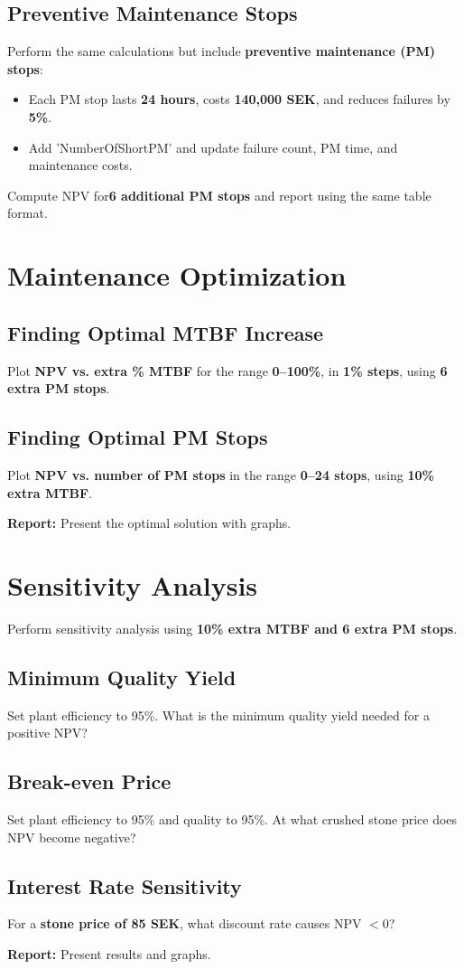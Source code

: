 \documentclass[a4paper,12pt]{exam}
\begin{document}
\subsection{Preventive Maintenance Stops}
Perform the same calculations but include \textbf{preventive maintenance (PM) stops}:
\begin{itemize}
    \item Each PM stop lasts \textbf{24 hours}, costs \textbf{140,000 SEK}, and reduces failures by \textbf{5\%}.
    \item Add 'NumberOfShortPM' and update failure count, PM time, and maintenance costs.
\end{itemize}
Compute NPV for\textbf{6 additional PM stops} and report using the same table format.

\section{Maintenance Optimization}
\subsection{Finding Optimal MTBF Increase}
Plot \textbf{NPV vs. extra \% MTBF} for the range \textbf{0–100\%}, in \textbf{1\% steps}, using \textbf{6 extra PM stops}.

\subsection{Finding Optimal PM Stops}
Plot \textbf{NPV vs. number of PM stops} in the range \textbf{0–24 stops}, using \textbf{10\% extra MTBF}.

\textbf{Report:} Present the optimal solution with graphs.

\section{Sensitivity Analysis}
Perform sensitivity analysis using \textbf{10\% extra MTBF and 6 extra PM stops}.

\subsection{Minimum Quality Yield}
Set plant efficiency to 95\%. What is the minimum quality yield needed for a positive NPV? 

\subsection{Break-even Price}
Set plant efficiency to 95\% and quality to 95\%. At what crushed stone price does NPV become negative?

\subsection{Interest Rate Sensitivity}
For a \textbf{stone price of 85 SEK}, what discount rate causes NPV $<0$?

\textbf{Report:} Present results and graphs.
\end{document}
